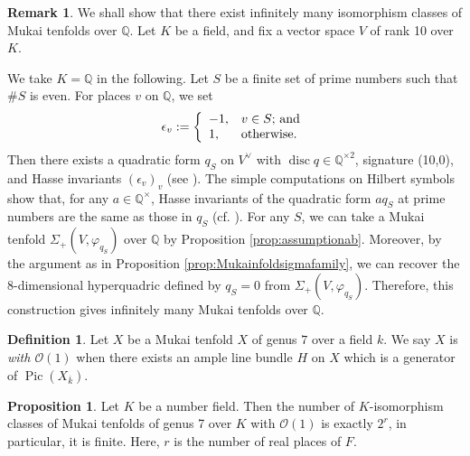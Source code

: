 \documentclass[autodetect-engine, a4paper]{amsart}
\theoremstyle{definition}
\newtheorem{prop}[thm]{Proposition}
\newtheorem{rem}[thm]{Remark}
\newtheorem{defn}[thm]{Definition}
\def\Q{{\mathbb Q}}
\def\cO{\mathcal{O}}
\DeclareMathOperator\Pic{\mathrm{Pic}}
\DeclareMathOperator\disc{\mathrm{disc}}
\begin{document}
\begin{rem}
\label{rem:mukai10}
We shall show that there exist infinitely many isomorphism classes of Mukai tenfolds over $\Q$. 
Let $K$ be a field, and
fix a vector space $V$ of rank 10 over $K$.




We take $K=\Q$ in the following.
Let $S$ be a finite set of prime numbers 
such that $\# S$ is even.
For places $v$ on $\Q$, we set 
\[
\epsilon_{v} :=
\left\{
\begin{array}{ll}
-1, & v \in S \textup{; and}  \\
1,& \textup{otherwise.}
\end{array}
\right.
\]
Then there exists a quadratic form $q_{S}$ on $V^{\vee}$ with  $\disc q \in \Q^{\times 2}$, signature (10,0), and Hasse invariants $(\epsilon_{v})_v$ (see \cite[Chapter IV, Proposition 7]{SerreArithmetic}).
The simple computations on Hilbert symbols show that, for any $a \in \Q^{\times}$, Hasse invariants of the quadratic form $a q_{S}$ at prime numbers are the same as those in $q_S$ (cf. \cite[Chapter III, Theorem 1]{SerreArithmetic}).
For any $S$, 
we can take a Mukai tenfold $\Sigma_{+} (V, \varphi_{q_{S}})$ over $\Q$ by Proposition \ref{prop:assumptionab}.
Moreover, by the argument as in Proposition \ref{prop:Mukainfoldsigmafamily}, we can recover the $8$-dimensional hyperquadric defined by $q_{S}=0$ from $\Sigma_{+} (V, \varphi_{q_{S}})$.
Therefore, this construction gives infinitely many Mukai tenfolds over $\Q.$
\end{rem}


\begin{defn}
Let $X$ be a Mukai tenfold $X$ of genus $7$ over a field $k$.
We say $X$ is \emph{with $\cO (1)$} when there exists an ample line bundle $H$ on $X$ which is a generator of $\Pic (X_{\overline{k}})$.
\end{defn}

\begin{prop}
\label{prop:mukaitenO1finite}
Let $K$ be a number field.
Then the number of $K$-isomorphism classes of Mukai tenfolds of genus 7 over $K$ with $\cO (1)$ is exactly $2^r$, in particular, it is finite.
Here, $r$ is the number of real places of $F$.
\end{prop}
\end{document}
